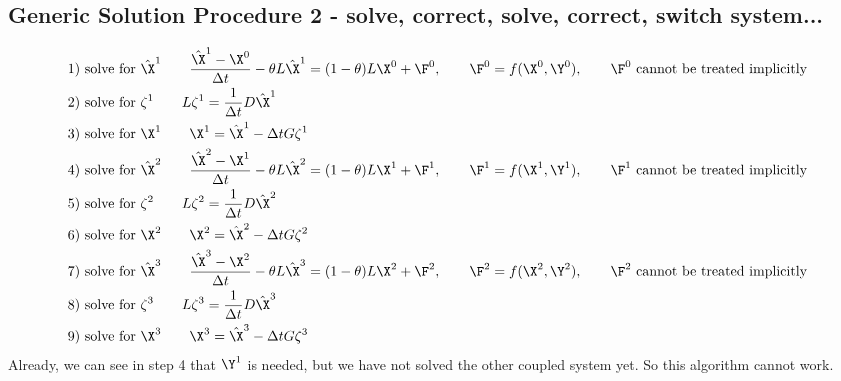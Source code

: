 \documentclass[11pt]{article}
\begin{document}
\subsection{Generic Solution Procedure 2 - solve, correct, solve, correct, switch system...}
\begin{equation}\begin{aligned}
&\text{1) solve for }\hat{\X}^1 \qquad \frac{\hat{\X}^1-\X^0}{\Delta t} - \theta L\hat{\X}^1 = (1-\theta) L\X^0 + \F^0, \qquad \F^0 = f(\X^0,\Y^0), \qquad \F^0 \text{ cannot be treated implicitly}\\
&\text{2) solve for } \zeta^{1} \qquad L \zeta^{1} = \frac{1}{\Delta t} D \hat{\X}^1 \\
&\text{3) solve for } \X^{1}    \qquad \X^{1} = \hat{\X}^1 - \Delta t G \zeta^{1} \\
&\text{4) solve for }\hat{\X}^2 \qquad \frac{\hat{\X}^2-\X^1}{\Delta t} - \theta L\hat{\X}^2 = (1-\theta) L\X^1 + \F^1, \qquad \F^1 = f(\X^1,\Y^1), \qquad \F^1 \text{ cannot be treated implicitly}\\
&\text{5) solve for } \zeta^{2} \qquad L \zeta^{2} = \frac{1}{\Delta t} D \hat{\X}^2 \\
&\text{6) solve for } \X^{2}    \qquad \X^{2} = \hat{\X}^2 - \Delta t G \zeta^{2} \\
&\text{7) solve for }\hat{\X}^3 \qquad \frac{\hat{\X}^3-\X^2}{\Delta t} - \theta L\hat{\X}^3 = (1-\theta) L\X^2 + \F^2, \qquad \F^2 = f(\X^2,\Y^2), \qquad \F^2 \text{ cannot be treated implicitly}\\
&\text{8) solve for } \zeta^{3} \qquad L \zeta^{3} = \frac{1}{\Delta t} D \hat{\X}^3 \\
&\text{9) solve for } \X^{3}    \qquad \X^{3} = \hat{\X}^3 - \Delta t G \zeta^{3} \\
\end{aligned}\end{equation}
Already, we can see in step 4 that $\Y^1$ is needed, but we have not solved the other coupled system yet. So this algorithm cannot work.
\end{document}
